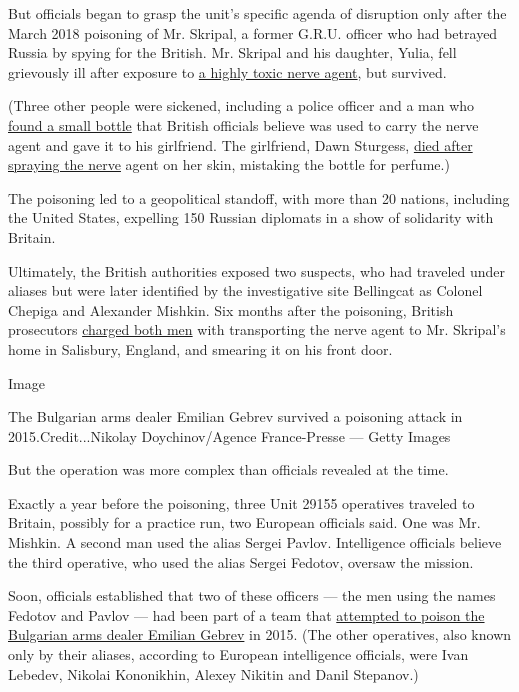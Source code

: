 But officials began to grasp the unit's specific agenda of disruption
only after the March 2018 poisoning of Mr. Skripal, a former G.R.U.
officer who had betrayed Russia by spying for the British. Mr. Skripal
and his daughter, Yulia, fell grievously ill after exposure to
\href{https://www.nytimes.com/2018/03/13/world/europe/uk-russia-spy-poisoning.html?module=inline}{a
highly toxic nerve agent}, but survived.

(Three other people were sickened, including a police officer and a man
who
\href{https://www.nytimes.com/2018/07/24/world/europe/russia-uk-poison-charlie-rowley.html}{found
a small bottle} that British officials believe was used to carry the
nerve agent and gave it to his girlfriend. The girlfriend, Dawn
Sturgess,
\href{https://www.nytimes.com/2018/07/08/world/europe/uk-dawn-sturgess-novichok-salisbury.html}{died
after spraying the nerve} agent on her skin, mistaking the bottle for
perfume.)

The poisoning led to a geopolitical standoff, with more than 20 nations,
including the United States, expelling 150 Russian diplomats in a show
of solidarity with Britain.

Ultimately, the British authorities exposed two suspects, who had
traveled under aliases but were later identified by the investigative
site Bellingcat as Colonel Chepiga and Alexander Mishkin. Six months
after the poisoning, British prosecutors
\href{https://www.nytimes.com/2018/09/05/world/europe/salisbury-novichok-poisoning.html}{charged
both men} with transporting the nerve agent to Mr. Skripal's home in
Salisbury, England, and smearing it on his front door.

Image

The Bulgarian arms dealer Emilian Gebrev survived a poisoning attack in
2015.Credit...Nikolay Doychinov/Agence France-Presse --- Getty Images

But the operation was more complex than officials revealed at the time.

Exactly a year before the poisoning, three Unit 29155 operatives
traveled to Britain, possibly for a practice run, two European officials
said. One was Mr. Mishkin. A second man used the alias Sergei Pavlov.
Intelligence officials believe the third operative, who used the alias
Sergei Fedotov, oversaw the mission.

Soon, officials established that two of these officers --- the men using
the names Fedotov and Pavlov --- had been part of a team that
\href{https://www.nytimes.com/2019/02/11/world/europe/bulgaria-poisoning-russia-skripal.html}{attempted
to poison the Bulgarian arms dealer Emilian Gebrev} in 2015. (The other
operatives, also known only by their aliases, according to European
intelligence officials, were Ivan Lebedev, Nikolai Kononikhin, Alexey
Nikitin and Danil Stepanov.)

